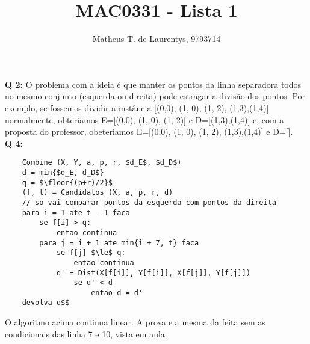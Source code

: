 \documentclass[]{article}
\title{\vspace{-4.0cm}MAC0331 - Lista 1}
\author{Matheus T. de Laurentys, 9793714}
\DeclarePairedDelimiter\floor{\lfloor}{\rfloor}
\begin{document}
	\maketitle
	\noindent
	\textbf{Q 2:} O problema com a ideia é que manter os pontos da linha separadora todos no mesmo conjunto (esquerda ou direita) pode estragar a divisão dos pontos. Por exemplo, se fossemos dividir a instância [(0,0), (1, 0), (1, 2), (1,3),(1,4)] normalmente, obteriamos E=[(0,0), (1, 0), (1, 2)] e D=[(1,3),(1,4)] e, com a proposta do professor, obeteriamos E=[(0,0), (1, 0), (1, 2), (1,3),(1,4)] e D=[].\\
	\textbf{Q 4:} 
	\begin{lstlisting}
	Combine (X, Y, a, p, r, $d_E$, $d_D$)
	d = min{$d_E, d_D$}
	q = $\floor{(p+r)/2}$
	(f, t) = Candidatos (X, a, p, r, d)
	// so vai comparar pontos da esquerda com pontos da direita
	para i = 1 ate t - 1 faca
		se f[i] > q:
			entao continua
		para j = i + 1 ate min{i + 7, t} faca
			se f[j] $\le$ q:
				entao continua
			d' = Dist(X[f[i]], Y[f[i]], X[f[j]], Y[f[j]])
				se d' < d
					entao d = d'
	devolva d$$
	\end{lstlisting}
	O algoritmo acima continua linear. A prova e a mesma da feita sem as condicionais das linha 7 e 10, vista em aula.
\end{document}
